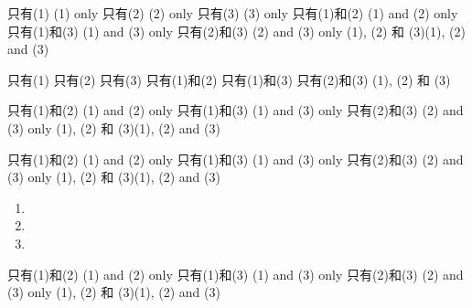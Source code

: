 \begin{tasks}
    \task 只有(1) \tab (1) only
    \task 只有(2) \tab (2) only
    \task 只有(3) \tab (3) only
    \task 只有(1)和(2) \tab (1) and (2) only
    \task 只有(1)和(3) \tab (1) and (3) only
    \task 只有(2)和(3) \tab (2) and (3) only
    \task (1), (2) 和 (3)\tab (1), (2) and (3)
\end{tasks}

\begin{tasks}
    \task 只有(1)
    \task 只有(2)
    \task 只有(3)
    \task 只有(1)和(2)
    \task 只有(1)和(3)
    \task 只有(2)和(3)
    \task (1), (2) 和 (3)
\end{tasks}


\begin{choices}
    \choice 只有(1)和(2) \tab (1) and (2) only
    \choice 只有(1)和(3) \tab (1) and (3) only
    \choice 只有(2)和(3) \tab (2) and (3) only
    \choice (1), (2) 和 (3)\tab (1), (2) and (3)
\end{choices}
\begin{choices}
    \choice 只有(1)和(2) \tab (1) and (2) only
    \choice 只有(1)和(3) \tab (1) and (3) only
    \choice 只有(2)和(3) \tab (2) and (3) only
    \choice (1), (2) 和 (3)\tab (1), (2) and (3)
\end{choices}


\question\vspace{1cm}
\begin{samepage}
    \begin{enumerate}[label=\sd]
        \item
              \par
        \item
              \par
        \item
              \par
    \end{enumerate}
\end{samepage}
\begin{samepage}
    \begin{choices}
        \choice 只有(1)和(2) \tab (1) and (2) only
        \choice 只有(1)和(3) \tab (1) and (3) only
        \choice 只有(2)和(3) \tab (2) and (3) only
        \choice (1), (2) 和 (3)\tab (1), (2) and (3)
    \end{choices}
\end{samepage}

\question\vspace{1cm}
\begin{schoices}
    \choice
    \choice
    \choice
\end{schoices}
\begin{mchoices}
    \choice
    \choice
    \choice
    \item
\end{mchoices}


